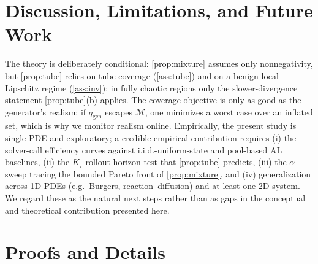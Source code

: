 \documentclass{article}
\theoremstyle{plain}
\theoremstyle{definition}
\theoremstyle{remark}
\newcommand{\manifold}{\mathcal{M}}
\newcommand{\qgen}{q_{\mathrm{gen}}}
\newcommand{\unif}{\alpha}
\begin{document}
\section{Discussion, Limitations, and Future Work}\label{sec:disc}
The theory is deliberately conditional: \cref{prop:mixture} assumes only nonnegativity, but
\cref{prop:tube} relies on tube coverage (\cref{ass:tube}) and on a benign local Lipschitz regime
(\cref{ass:inv}); in fully chaotic regions only the slower-divergence statement \cref{prop:tube}(b)
applies. The coverage objective is only as good as the generator's realism: if $\qgen$ escapes
$\manifold$, one minimizes a worst case over an inflated set, which is why we monitor realism online.
Empirically, the present study is single-PDE and exploratory; a credible empirical contribution requires
(i) the solver-call efficiency curves against i.i.d.-uniform-state and pool-based AL baselines, (ii) the
$K_\tau$ rollout-horizon test that \cref{prop:tube} predicts, (iii) the $\unif$-sweep tracing the bounded
Pareto front of \cref{prop:mixture}, and (iv) generalization across 1D PDEs (e.g.\ Burgers,
reaction--diffusion) and at least one 2D system. We regard these as the natural next steps rather than
as gaps in the conceptual and theoretical contribution presented here.

\appendix
\section{Proofs and Details}\label{app:proofs}
\end{document}
